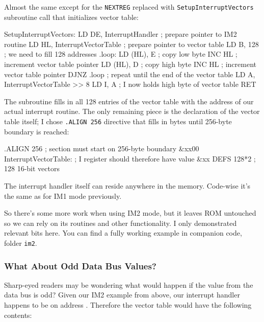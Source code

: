 Almost the same except for the {\tt NEXTREG} replaced with {\tt SetupInterruptVectors} subroutine call that initializes vector table:

\begin{tcblisting}{}
SetupInterruptVectors:
	LD DE, InterruptHandler        ; prepare pointer to IM2 routine
	LD HL, InterruptVectorTable   ; prepare pointer to vector table
	LD B, 128                      ; we need to fill 128 addresses
.loop:
	LD (HL), E                     ; copy low byte
	INC HL                         ; increment vector table pointer
	LD (HL), D	                   ; copy high byte
	INC HL                         ; increment vector table pointer
	DJNZ .loop                     ; repeat until the end of the vector table
	LD A, InterruptVectorTable >> 8
	LD I, A                        ; I now holds high byte of vector table
	RET
\end{tcblisting}

The subroutine fills in all 128 entries of the vector table with the address of our actual interrupt routine. The only remaining piece is the declaration of the vector table itself; I chose {\tt .ALIGN 256} directive that fills in bytes until 256-byte boundary is reached:

\begin{tcblisting}{}
	.ALIGN 256                     ; section must start on 256-byte boundary &xx00
InterruptVectorTable:              ; I register should therefore have value &xx
	DEFS 128*2                     ; 128 16-bit vectors	
\end{tcblisting}

The interrupt handler itself can reside anywhere in the memory. Code-wise it's the same as for IM1 mode previously.

So there's some more work when using IM2 mode, but it leaves ROM untouched so we can rely on its routines and other functionality. I only demonstrated relevant bits here. You can find a fully working example in companion code, folder {\tt im2}.


\subsubsection{What About Odd Data Bus Values?}

Sharp-eyed readers may be wondering what would happen if the value from the data bus is odd? Given our IM2 example from above, our interrupt handler happens to be on address . Therefore the vector table would have the following contents:

